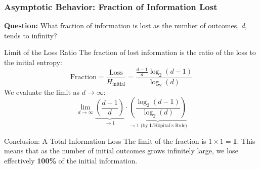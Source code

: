 \documentclass{beamer}
\begin{document}




\begin{frame}
\frametitle{Asymptotic Behavior: Fraction of Information Lost}
\small %

\textbf{Question:} What fraction of information is lost as the number of outcomes, \textit{d}, tends to infinity?

\begin{block}{Limit of the Loss Ratio}
The fraction of lost information is the ratio of the loss to the initial entropy:
\[
    \text{Fraction} = \frac{\text{Loss}}{H_{\text{initial}}} = \frac{\frac{d-1}{d} \log_2(d-1)}{\log_2(d)}
\]
We evaluate the limit as $d \to \infty$:
\[
    \lim_{d \to \infty} \underbrace{\left( \frac{d-1}{d} \right)}_{\to 1} \cdot \underbrace{\left( \frac{\log_2(d-1)}{\log_2(d)} \right)}_{\to 1 \text{ (by L'H\^{o}pital's Rule)}}
\]
\end{block}

\begin{alertblock}{Conclusion: A Total Information Loss}
The limit of the fraction is $1 \times 1 = \textbf{1}$.
This means that as the number of initial outcomes grows infinitely large, we lose effectively \textbf{100\%} of the initial information.
\end{alertblock}

\end{frame}
\end{document}
